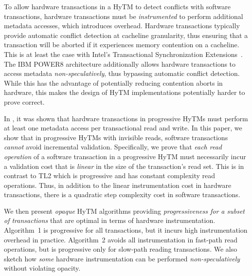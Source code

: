 To allow hardware transactions in a HyTM to detect conflicts with software transactions, hardware transactions must be \emph{instrumented} to perform additional metadata accesses, which introduces overhead.
Hardware transactions typically provide automatic conflict detection at cacheline granularity,
thus ensuring that a transaction will be aborted if it experiences memory contention on a cacheline.
This is at least the case with Intel's Transactional Synchronization Extensions~\cite{haswell}.
The IBM POWER8 architecture additionally allows hardware transactions to access metadata \emph{non-speculatively}, 
thus bypassing automatic conflict detection. While this has the advantage of potentially reducing contention aborts
in hardware, this makes the design of HyTM implementations potentially harder to prove correct.

In \cite{htmdisc15}, it was shown that hardware transactions in progressive HyTMs must perform
at least one metadata access per transactional read and write.
In this paper, we show that in progressive HyTMs with invisible reads, 
software transactions \textit{cannot} avoid incremental validation.
Specifically, we prove that \textit{each read operation} of a software transaction in a progressive HyTM
must necessarily incur a validation cost that is \emph{linear} 
in the size of the transaction's read set. 
This is in contrast to TL2 which is progressive and has constant complexity read operations.
Thus, in addition to the linear instrumentation cost in hardware transactions, there is a quadratic step complexity cost in software transactions.

We then present \emph{opaque} HyTM algorithms providing \emph{progressiveness for a subset of transactions} that are  %
optimal in terms of hardware instrumentation.
Algorithm~1 is progressive for all transactions, but it incurs high instrumentation overhead in practice.
Algorithm~2 avoids all instrumentation in fast-path read operations, but is progressive only for slow-path reading transactions.
We also sketch how \emph{some} hardware instrumentation can be performed \textit{non-speculatively} without violating opacity.

